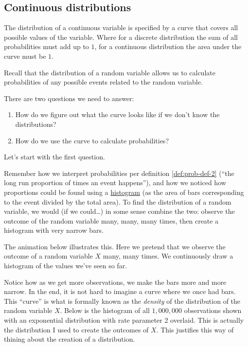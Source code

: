 \documentclass[]{book}
\providecommand{\tightlist}{%
  \setlength{\itemsep}{0pt}\setlength{\parskip}{0pt}}
\theoremstyle{definition}
\theoremstyle{definition}
\theoremstyle{definition}
\theoremstyle{remark}
\begin{document}
\hypertarget{continuous-distributions}{%
\subsection{Continuous distributions}\label{continuous-distributions}}

The distribution of a continuous variable is specified by a curve that covers all possible values of the variable. Where for a discrete distribution the sum of all probabilities must add up to \(1\), for a continuous distribution the area under the curve must be \(1\).

Recall that the distribution of a random variable allows us to calculate probabilities of any possible events related to the random variable.

There are two questions we need to answer:

\begin{enumerate}
\def\labelenumi{\arabic{enumi}.}
\tightlist
\item
  How do we figure out what the curve looks like if we don't know the distributions?
\item
  How do we use the curve to calculate probabilities?
\end{enumerate}

Let's start with the first question.

Remember how we interpret probabilities per definition \ref{def:prob-def-2} (``the long run proportion of times an event happens''), and how we noticed how proportions could be found using a \protect\hyperlink{histogram}{histogram} (as the area of bars corresponding to the event divided by the total area). To find the distribution of a random variable, we would (if we could\ldots) in some sense combine the two: observe the outcome of the random variable many, many, many times, then create a histogram with very narrow bars.

The animation below illustrates this. Here we pretend that we observe the outcome of a random variable \(X\) many, many times. We continuously draw a histogram of the values we've seen so far.

Notice how as we get more observations, we make the bars more and more narrow. In the end, it is not hard to imagine a curve where we once had bars. This ``curve'' is what is formally known as the \emph{density} of the distribution of the random variable \(X\). Below is the histogram of all \(1,000,000\) observations shown with an exponential distribution with rate parameter 2 overlaid. This is actually the distribution I used to create the outcomes of \(X\). This justifies this way of thining about the creation of a distribution.
\end{document}
